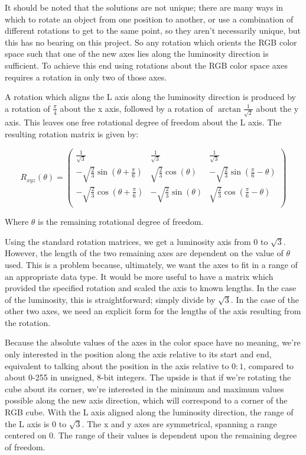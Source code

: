 It should be noted that the solutions are not unique; there are many ways in which to rotate an object from one position to another, or use a combination of different rotations to get to the same point, so they aren't necessarily unique, but this has no bearing on this project. So any rotation which orients the RGB color space such that one of the new axes lies along the luminosity direction is sufficient. To achieve this end using rotations about the RGB color space axes requires a rotation in only two of those axes.

A rotation which aligns the L axis along the luminosity direction is produced by a rotation of $\frac{\pi}4$ about the x axis, followed by a rotation of $\arctan{\frac{1}{\sqrt{2}}}$ about the y axis. This leaves one free rotational degree of freedom about the L axis. The resulting rotation matrix is given by:

\begin{equation}
R_{xyz}(\theta) =
\left(
\begin{array}{ccc}
 \frac{1}{\sqrt{3}} & \frac{1}{\sqrt{3}} & \frac{1}{\sqrt{3}} \\
 -\sqrt{\frac{2}{3}} \sin \left(\theta +\frac{\pi }{6}\right) & \sqrt{\frac{2}{3}} \cos (\theta ) & -\sqrt{\frac{2}{3}} \sin \left(\frac{\pi }{6}-\theta \right) \\
 -\sqrt{\frac{2}{3}} \cos \left(\theta +\frac{\pi }{6}\right) & -\sqrt{\frac{2}{3}} \sin (\theta ) & \sqrt{\frac{2}{3}} \cos \left(\frac{\pi }{6}-\theta \right) \\
\end{array}
\right)
\end{equation}


Where $\theta$ is the remaining rotational degree of freedom.

Using the standard rotation matrices, we get a luminosity axis from 0 to $\sqrt{3}$. However, the length of the two remaining axes are dependent on the value of $\theta$ used. This is a problem because, ultimately, we want the axes to fit in a range of an appropriate data type. It would be more useful to have a matrix which provided the specified rotation and scaled the axis to known lengths. In the case of the luminosity, this is straightforward; simply divide by $\sqrt{3}$. In the case of the other two axes, we need an explicit form for the lengths of the axis resulting from the rotation.

Because the absolute values of the axes in the color space have no meaning, we're only interested in the position along the axis relative to its start and end, equivalent to talking about the position in the axis relative to $0:1$, compared to about 0-255 in unsigned, 8-bit integers. The upside is that if we're rotating the cube about its corner, we're interested in the minimum and maximum values possible along the new axis direction, which will correspond to a corner of the RGB cube. With the L axis aligned along the luminosity direction, the range of the L axis is 0 to $\sqrt{3}$. The x and y axes are symmetrical, spanning a range centered on 0. The range of their values is dependent upon the remaining degree of freedom.


